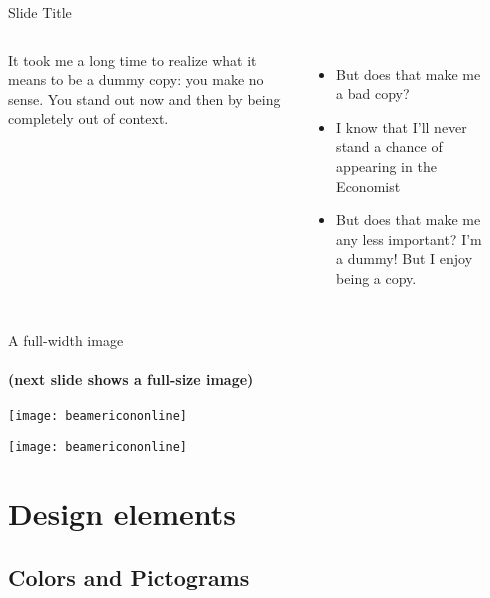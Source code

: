 \documentclass[
 UKenglish%
 ]{beamer}%
\begin{document}
{
\begin{frame}[b,whiteKITlogo]{Slide Title}%
  \begin{columns}
    \column[b]{0.34\hsize}
    It took me a long time to realize what it means to be a dummy copy: you make no sense.
    You stand out now and then by being completely out of context.

    \bigskip
    \begin{itemize}
    \item But does that make me a bad copy?
    \item I know that I’ll never stand a chance of appearing in the Economist
    \item But does that make me any less important? I’m a dummy! But I enjoy being a copy.
    \end{itemize}
    \vspace*{7\baselineskip}
    \column[b]{0.33\hsize}
    \column[b]{0.33\hsize}
    \\[-1pt]
  \end{columns}%
  \vspace*{-7.2mm}%
\end{frame}}

\begin{frame}{A full-width image}
  \framesubtitle{(next slide shows a full-size image)}
  \hspace*{-4.96mm}%
  \texttt{[image: beamericononline]}\kern-4.72mm
\end{frame}

{
 {\texttt{[image: beamericononline]}}%
 \frame[empty]{}}

\section{Design elements}
\subsection{Colors and Pictograms}
\end{document}
